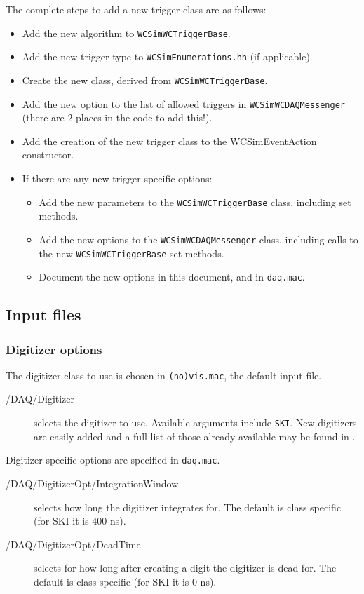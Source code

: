 The complete steps to add a new trigger class are as follows:
\begin{itemize}
\item Add the new algorithm to \texttt{WCSimWCTriggerBase}.
\item Add the new trigger type to \texttt{WCSimEnumerations.hh} (if applicable).
\item Create the new class, derived from \texttt{WCSimWCTriggerBase}.
\item Add the new option to the list of allowed triggers in \texttt{WCSimWCDAQMessenger} (there are 2 places in the code to add this!). 
\item Add the creation of the new trigger class to the WCSimEventAction constructor.
\item If there are any new-trigger-specific options:
  \begin{itemize}
  \item Add the new parameters to the \texttt{WCSimWCTriggerBase} class, including set methods.
  \item Add the new options to the \texttt{WCSimWCDAQMessenger} class, including calls to the new \texttt{WCSimWCTriggerBase} set methods.
  \item Document the new options in this document, and in \texttt{daq.mac}.
  \end{itemize}
\end{itemize}


\subsection{Input files}
\label{sec:daq:options}

\subsubsection{Digitizer options}
The digitizer class to use is chosen in \texttt{(no)vis.mac}, the default input file.
\begin{description}
\item[/DAQ/Digitizer] selects the digitizer to use. Available arguments include \texttt{SKI}. New digitizers are easily added and a full list of those already available may be found in .
\end{description}
Digitizer-specific options are specified in \texttt{daq.mac}.
\begin{description}
\item[/DAQ/DigitizerOpt/IntegrationWindow] selects how long the digitizer integrates for. The default is class specific (for SKI it is 400 ns).
\item[/DAQ/DigitizerOpt/DeadTime] selects for how long after creating a digit the digitizer is dead for. The default is class specific (for SKI it is 0 ns).
\end{description}

